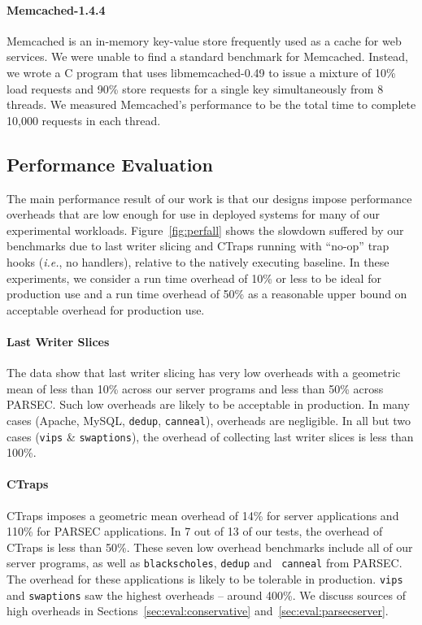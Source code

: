 \documentclass[preprint,10pt]{sigplanconf}
\newcommand{\ctraps}{CTraps\xspace}
\begin{document}
\paragraph{Memcached-1.4.4}
Memcached is an in-memory key-value store frequently used as a cache for web
services.  We were unable to find a standard benchmark for Memcached.  Instead,
we wrote a C program that uses libmemcached-0.49 to issue a
mixture of 10\% load requests and 90\% store requests for a single key 
simultaneously from 8 threads.  We measured Memcached's performance to be the
total time to complete 10,000 requests in each thread.



\subsection{Performance Evaluation}
\label{sec:eval:perf}

The main performance result of our work is that our designs impose performance
overheads that are low enough for use in deployed systems for many of our
experimental workloads.  Figure~\ref{fig:perfall} shows the slowdown suffered
by our benchmarks due to last writer slicing and \ctraps running with ``no-op''
trap hooks ({\em i.e.}, no handlers), relative to the natively executing
baseline.  In these experiments, we consider a run time overhead of 10\% or
less to be ideal for production use and a run time overhead of 50\% as
a reasonable upper bound on acceptable overhead for production use.

\paragraph{Last Writer Slices}
The data show that last writer slicing has very low overheads with a geometric
mean of less than 10\% across our server programs and less than 50\% across
PARSEC.  Such low overheads are likely to be acceptable in production.  In many
cases (Apache, MySQL, {\tt dedup}, {\tt canneal}), overheads are negligible.
In all but two cases ({\tt vips} \& {\tt swaptions}), the overhead of
collecting last writer slices is less than 100\%.    

\paragraph{\ctraps}
\ctraps imposes a geometric mean overhead of 14\% for server applications and
110\% for PARSEC applications.  In 7 out of 13 of our tests, the overhead of
\ctraps is less than 50\%.  These seven low overhead benchmarks include all of
our server programs, as well as {\tt blackscholes}, {\tt dedup} and {\tt
canneal} from PARSEC.  The overhead for these applications is likely to be
tolerable in production.  {\tt vips} and {\tt swaptions} saw the highest
overheads -- around 400\%.  We discuss sources of high overheads in
Sections~\ref{sec:eval:conservative} and~\ref{sec:eval:parsecserver}.
\end{document}
